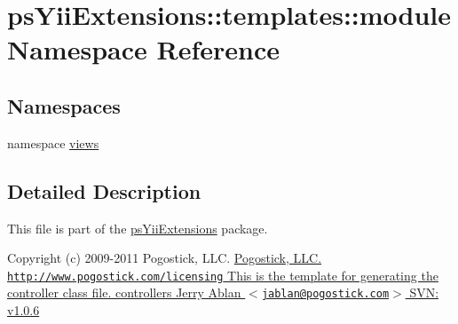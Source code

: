 \hypertarget{namespacepsYiiExtensions_1_1templates_1_1module}{
\section{psYiiExtensions::templates::module Namespace Reference}
\label{namespacepsYiiExtensions_1_1templates_1_1module}
}
\subsection*{Namespaces}
\begin{DoxyCompactItemize}
\item 
namespace \hyperlink{namespacepsYiiExtensions_1_1templates_1_1module_1_1views}{views}
\end{DoxyCompactItemize}


\subsection{Detailed Description}
This file is part of the \hyperlink{namespacepsYiiExtensions}{psYiiExtensions} package.

Copyright (c) 2009-\/2011 Pogostick, LLC. \hyperlink{}{Pogostick, LLC.  \href{http://www.pogostick.com/licensing}{\tt http://www.pogostick.com/licensing} This is the template for generating the controller class file.   controllers   Jerry Ablan $<$\href{mailto:jablan@pogostick.com}{\tt jablan@pogostick.com}$>$  SVN:   v1.0.6   }